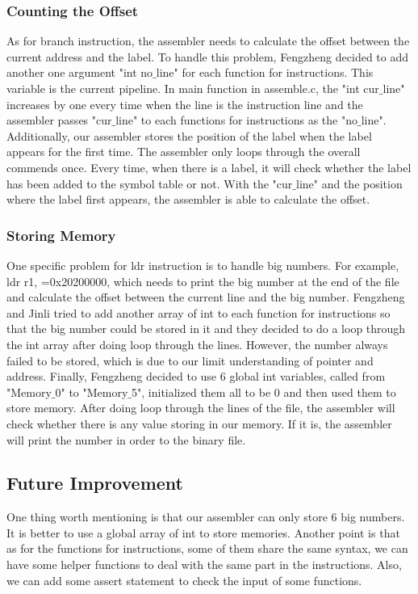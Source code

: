 \documentclass[11pt]{article}
\begin{document}
\subsubsection{Counting the Offset}
As for branch instruction, the assembler needs to calculate the offset between the current address and the label. To handle this problem, Fengzheng decided to add another one argument "int no$\_$line" for each function for instructions. This variable is the current pipeline. In main function in assemble.c, the "int cur$\_$line" increases by one every time when the line is the instruction line and the assembler passes "cur$\_$line" to each functions for instructions as the "no$\_$line". Additionally, our assembler stores the position of the label when the label appears for the first time. The assembler only loops through the overall commends once. Every time, when there is a label, it will check whether the label has been added to the symbol table or not. With the "cur$\_$line" and the position where the label first appears, the assembler is able to calculate the offset.

\subsubsection{Storing Memory}
One specific problem for ldr instruction is to handle big numbers. For example, ldr r1, =0x20200000, which needs to print the big number at the end of the file and calculate the offset between the current line and the big number. Fengzheng and Jinli tried to add another array of int to each function for instructions so that the big number could be stored in it and they decided to do a loop through the int array after doing loop through the lines. However, the number always failed to be stored, which is due to our limit understanding of pointer and address. Finally, Fengzheng decided to use 6 global int variables, called from "Memory$\_$0" to "Memory$\_$5", initialized them all to be 0 and then used them to store memory. After doing loop through the lines of the file, the assembler will check whether there is any value storing in our memory. If it is, the assembler will print the number in order to the binary file.

\subsection{Future Improvement}
One thing worth mentioning is that our assembler can only store 6 big numbers. It is better to use a global array of int to store memories. Another point is that as for the functions for instructions, some of them share the same syntax, we can have some helper functions to deal with the same part in the instructions. Also, we can add some assert statement to check the input of some functions.
\end{document}
